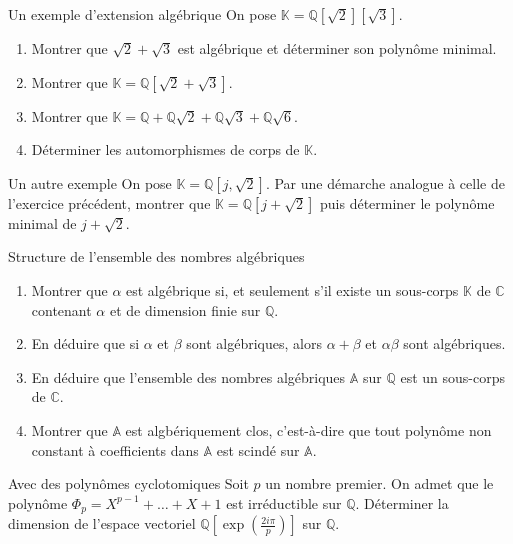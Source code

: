 \documentclass[french,a4paper]{article}
\newcommand{\Q}{\mathbb{Q}}
\newcommand{\C}{\mathbb{C}}
\newcommand{\K}{\mathbb{K}}
\theoremstyle{plain}
\theoremstyle{definition}
\theoremstyle{remark}
\begin{document}
\begin{ex}[Châteaux]{Un exemple d'extension algébrique}
	On pose $\K=\Q[\sqrt{2}][\sqrt3]$.
	\begin{enumerate}
		\item Montrer que $\sqrt{2}+\sqrt{3}$ est algébrique et déterminer son polynôme minimal.
		\item Montrer que $\K=\Q[\sqrt{2}+\sqrt{3}]$.
		\item Montrer que $\K=\Q+\Q\sqrt{2}+\Q\sqrt{3}+\Q\sqrt{6}$.
		\item Déterminer les automorphismes de corps de $\K$.
	\end{enumerate}
\end{ex}

\begin{ex}[Châteaux]{Un autre exemple}
	On pose $\K=\Q[j,\sqrt{2}]$. Par une démarche analogue à celle de l'exercice précédent, montrer que $\K=\Q[j+\sqrt{2}]$ puis déterminer le polynôme minimal de $j+\sqrt{2}$.
\end{ex}

\begin{ex}[Châteaux]{Structure de l'ensemble des nombres algébriques}
	\begin{enumerate}
		\item Montrer que $\alpha$ est algébrique si, et seulement s'il existe un sous-corps $\K$ de $\C$ contenant $\alpha$ et de dimension finie sur $\Q$.
		\item En déduire que si $\alpha$ et $\beta$ sont algébriques, alors $\alpha+\beta$ et $\alpha\beta$ sont algébriques.
		\item En déduire que l'ensemble des nombres algébriques $\mathbb{A}$ sur $\Q$ est un sous-corps de $\C$.
		\item Montrer que $\mathbb{A}$ est algbériquement clos, c'est-à-dire que tout polynôme non constant à coefficients dans $\mathbb{A}$ est scindé sur $\mathbb{A}$.
	\end{enumerate}
\end{ex}

\begin{ex}[Châteaux]{Avec des polynômes cyclotomiques}
	Soit $p$ un nombre premier. On admet que le polynôme $\Phi_p=X^{p-1}+\ldots+X+1$ est irréductible sur $\Q$. Déterminer la dimension de l'espace vectoriel $\Q\left[\exp\left(\frac{2i\pi}{p}\right)\right]$ sur $\Q$.
\end{ex}
\end{document}

